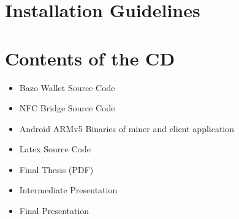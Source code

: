 \appendix

\chapter{Installation Guidelines}

\chapter{Contents of the CD}
\begin{itemize}
\item Bazo Wallet Source Code
\item NFC Bridge Source Code
\item Android ARMv5 Binaries of miner and client application
\item Latex Source Code
\item Final Thesis (PDF)
\item Intermediate Presentation
\item Final Presentation

\end{itemize}